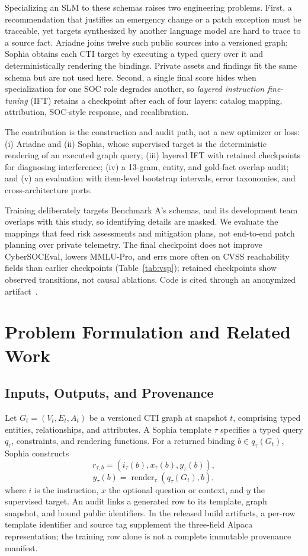 \documentclass[conference]{IEEEtran}
\begin{document}
Specializing an SLM to these schemas raises two engineering problems. First, a recommendation that justifies an emergency change or a patch exception must be traceable, yet targets synthesized by another language model are hard to trace to a source fact. Ariadne joins twelve such public sources into a versioned graph; Sophia obtains each CTI target by executing a typed query over it and deterministically rendering the bindings. Private assets and findings fit the same schema but are not used here. Second, a single final score hides when specialization for one SOC role degrades another, so \emph{layered instruction fine-tuning} (IFT) retains a checkpoint after each of four layers: catalog mapping, attribution, SOC-style response, and recalibration.

The contribution is the construction and audit path, not a new optimizer or loss: (i) Ariadne and (ii) Sophia, whose supervised target is the deterministic rendering of an executed graph query; (iii) layered IFT with retained checkpoints for diagnosing interference; (iv) a 13-gram, entity, and gold-fact overlap audit; and (v) an evaluation with item-level bootstrap intervals, error taxonomies, and cross-architecture ports.

Training deliberately targets Benchmark A's schemas, and its development team overlaps with this study, so identifying details are masked. We evaluate the mappings that feed risk assessments and mitigation plans, not end-to-end patch planning over private telemetry. The final checkpoint does not improve CyberSOCEval, lowers MMLU-Pro, and errs more often on CVSS reachability fields than earlier checkpoints (Table~\ref{tab:vsp}); retained checkpoints show observed transitions, not causal ablations. Code is cited through an anonymized artifact~\cite{anonartifact}.

\section{Problem Formulation and Related Work}
\subsection{Inputs, Outputs, and Provenance}
Let $G_t=(V_t,E_t,A_t)$ be a versioned CTI graph at snapshot $t$, comprising typed entities, relationships, and attributes. A Sophia template $\tau$ specifies a typed query $q_\tau$, constraints, and rendering functions. For a returned binding $b\in q_\tau(G_t)$, Sophia constructs
\begin{equation}
 r_{\tau,b}=\left(i_\tau(b),x_\tau(b),y_\tau(b)\right),
\end{equation}
\begin{equation}
 y_\tau(b)=\operatorname{render}_\tau\left(q_\tau(G_t),b\right),
\end{equation}
where $i$ is the instruction, $x$ the optional question or context, and $y$ the supervised target. An audit links a generated row to its template, graph snapshot, and bound public identifiers. In the released build artifacts, a per-row template identifier and source tag supplement the three-field Alpaca representation; the training row alone is not a complete immutable provenance manifest.
\end{document}
